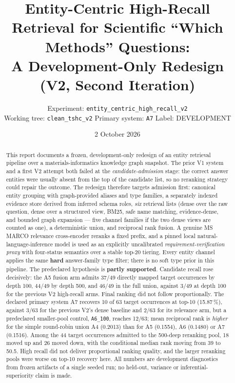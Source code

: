 \documentclass[11pt,a4paper]{article}
\title{Entity-Centric High-Recall Retrieval for Scientific ``Which Methods'' Questions:\\
A Development-Only Redesign (V2, Second Iteration)}
\author{Experiment: \texttt{entity\_centric\_high\_recall\_v2} \\
Working tree: \texttt{clean\_tshc\_v2} \quad Primary system: \texttt{A7} \quad Label: DEVELOPMENT}
\date{2 October 2026}
\begin{document}
\maketitle

\begin{abstract}
This report documents a frozen, development-only redesign of an entity retrieval pipeline over a
materials-informatics knowledge graph snapshot. The prior V1 system and a first V2 attempt both failed at
the \emph{candidate-admission} stage: the correct answer entities were usually absent from the top of the
candidate list, so no reranking strategy could repair the outcome. The redesign therefore targets admission
first: canonical entity grouping with graph-provided aliases and type families, a separately indexed
evidence store derived from inferred schema roles, \emph{six} retrieval lists (dense over the raw question,
dense over a structured view, BM25, safe name matching, evidence-dense, and bounded graph expansion --- five
channel families if the two dense views are counted as one), a deterministic union, and reciprocal rank
fusion. A genuine MS MARCO relevance cross-encoder reranks a fixed prefix, and a pinned local
natural-language-inference model is used as an explicitly uncalibrated \emph{requirement-verification
proxy} with four-status semantics over a stable top-20 tiering. Every entity channel applies the same
\textbf{hard} answer-family type filter; there is no soft type prior in this pipeline.
The predeclared hypothesis is \textbf{partly supported}. Candidate recall rose decisively: the A5 fusion arm
admits 37/49 directly mapped target occurrences by depth 100, 44/49 by depth 500, and 46/49 in the full
union, against 3/49 at depth 100 for the previous V2 high-recall arms. Final ranking did not follow
proportionally. The declared primary system A7 recovers 10 of 63 target occurrences at top-10 (15.87\,\%),
against 3/63 for the previous V2's dense baseline and 2/63 for its relevance arm, but a predeclared
smaller-pool control, \texttt{A6\_100}, reaches 12/63; mean reciprocal rank is \emph{higher} for the simple
round-robin union A4 (0.2013) than for A5 (0.1554), A6 (0.1480) or A7 (0.1516). Among the 44 target
occurrences admitted to the 500-deep reranking pool, 18 moved up and 26 moved down, with the conditional
median rank moving from 39 to 50.5. High recall did not deliver proportional ranking quality, and the larger
reranking pools were worse on top-10 recovery here. All numbers are development diagnostics from frozen
artifacts of a single seeded run; no held-out, variance or inferential-superiority claim is made.
\end{abstract}
\end{document}
